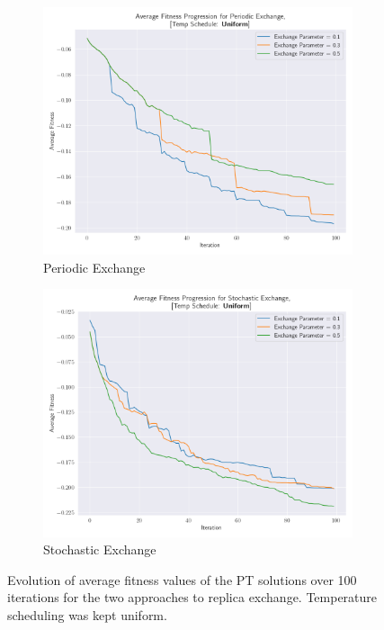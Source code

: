 \documentclass[10pt]{article}
\begin{document}
\begin{multicols}{2}
\begin{figure}[H]
    \centering
    \begin{subfigure}{0.48\textwidth}
        \centering
        \includegraphics[width=\textwidth]{../figures/Permanent Images/PT_Avg_Fitness_Evolution.png}
        \caption{Periodic Exchange}
        \label{fig:periodic_fitness}
    \end{subfigure}
    \begin{subfigure}{0.48\textwidth}
        \centering
        \includegraphics[width=\textwidth]{../figures/Permanent Images/PT_Avg_Fitness_Evolution_stoch.png}
        \caption{Stochastic Exchange}
        \label{fig:stochastic_fitness}
    \end{subfigure}
    \captionsetup{justification=centering}
    \caption{Evolution of average fitness values of the PT solutions over 100 iterations for the two approaches to replica exchange. Temperature scheduling was kept uniform.}
    \label{fig:fitness_PT}
\end{figure}


\end{multicols}
\end{document}
